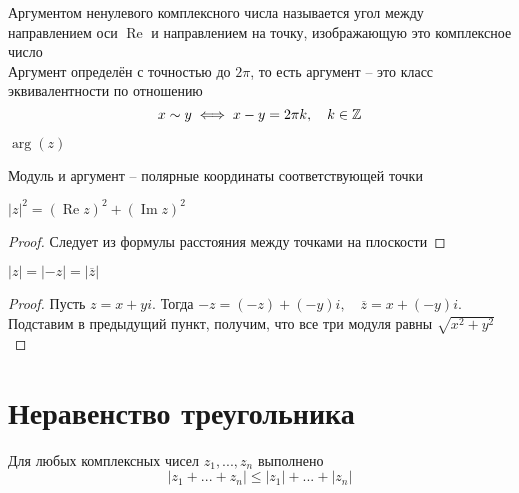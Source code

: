 \begin{definition}
	Аргументом ненулевого комплексного числа называется угол между направлением оси $\operatorname{Re}$ и направлением на точку, изображающую это комплексное число \\
	Аргумент определён с точностью до $2\pi$, то есть аргумент -- это класс эквивалентности по отношению
	$$ x \sim y \iff x - y = 2\pi k, \quad k \in \mathbb{Z} $$
	\begin{notation}
		$ \arg(z) $
	\end{notation}
\end{definition}

\begin{note}
	Модуль и аргумент -- полярные координаты соответствующей точки
\end{note}

\begin{props}
	\item $|z|^2 = (\operatorname{Re} z)^2 + (\operatorname{Im} z)^2 $
	\begin{proof}
		Следует из формулы расстояния между точками на плоскости
	\end{proof}
	\item $|z| = |-z| = |\overline{z}| $
	\begin{proof}
		Пусть $z = x +yi$. Тогда $-z = (-z) + (-y)i, \quad \overline{z} = x + (-y)i$. Подставим в предыдущий пункт, получим, что все три модуля равны $ \sqrt{x^2 + y^2} $
	\end{proof}
\end{props}

\section{Неравенство треугольника}

\begin{theorem}
	Для любых комплексных чисел $z_1, ..., z_n$ выполнено
	$$ |z_1 + ... + z_n| \le |z_1| + ... + |z_n| $$
\end{theorem}

